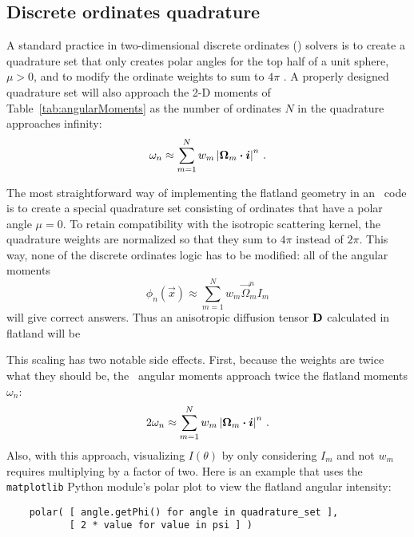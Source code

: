 \subsection{Discrete ordinates quadrature}

A standard practice in two-dimensional discrete ordinates (\SN) solvers is to
create a quadrature set that only creates polar angles for the top half of a
unit sphere, $\mu>0$, and to modify the ordinate weights to sum to $4\pi$
\cite{Zik1997}. A properly designed quadrature set will also approach the 2-D
moments of Table~\ref{tab:angularMoments} as the number of ordinates
$N$ in the quadrature approaches infinity:
\begin{equation*}
  \omega_n \approx \sum_{m=1}^{N} w_m \left|  \bm{\Omega}_m \bm{\cdot} \bm{i} \right|^n \,.
\end{equation*}

The most straightforward way of implementing the flatland geometry in an \SN\
code is to create a special quadrature set consisting of ordinates that have a
polar angle $\mu=0$. To retain compatibility with the isotropic scattering
kernel, the quadrature weights are normalized so that they sum to $4\pi$
instead of $2\pi$. This way, none of the discrete ordinates logic has to be
modified: all of the angular moments
\begin{equation*}
  \phi_n(\vec{x}) \approx \sum_{m=1}^{N} w_m \vec{\Omega}_m^n I_m
\end{equation*}
will give correct answers. Thus an anisotropic diffusion tensor $\mathbf{D}$
calculated in flatland will be 

This scaling has two notable side effects. First, because the weights are twice
what they should be, the \SN\ angular moments approach twice the flatland
moments $\omega_n$:
\begin{equation*}
  2 \omega_n \approx \sum_{m=1}^{N} w_m \left|  \bm{\Omega}_m \bm{\cdot} \bm{i} \right|^n \,.
\end{equation*}
Also, with this approach, visualizing $I(\theta)$ by only considering
$I_m$ and not $w_m$ requires multiplying by a factor of two. Here is an
example that uses the \verb|matplotlib| Python module's polar plot to view
the flatland angular intensity:
\begin{verbatim}
    polar( [ angle.getPhi() for angle in quadrature_set ],
           [ 2 * value for value in psi ] )
\end{verbatim}

